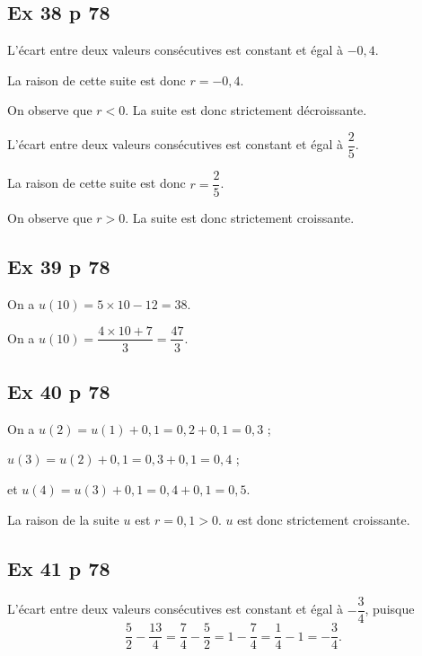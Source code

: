 \documentclass[12pt,a4paper]{book}
\begin{document}
\subsection*{Ex 38 p 78}


\begin{enumMet}
	\item L’écart entre deux valeurs consécutives est constant et égal à $-0,4$.
	
	La raison de cette suite est donc $r=-0,4$.
	
	On observe que $r<0$. La suite est donc strictement décroissante.
	\item L’écart entre deux valeurs consécutives est constant et égal à $\dfrac{2}{5}$.
	
	La raison de cette suite est donc $r=\dfrac{2}{5}$.
	
	On observe que $r>0$. La suite est donc strictement croissante.
\end{enumMet}

\subsection*{Ex 39 p 78}


\begin{enumMet}
	\item On a $u\left(10\right)=5 \times 10 -12=38$.
	\item On a $u\left(10\right)=\dfrac{4\times 10 +7}{3}=\dfrac{47}{3}$.
\end{enumMet}

\subsection*{Ex 40 p 78}

On a $u\left(2\right)=u\left(1\right)+0,1=0,2+0,1=0,3$ ;

$u\left(3\right)=u\left(2\right)+0,1=0,3+0,1=0,4$ ;

et $u\left(4\right)=u\left(3\right)+0,1=0,4+0,1=0,5$.



La raison de la suite $u$ est $r=0,1 >0$. $u$ est donc strictement croissante.

\subsection*{Ex 41 p 78}

L’écart entre deux valeurs consécutives est constant et égal à $-\dfrac{3}{4}$, puisque $$\dfrac{5}{2}-\dfrac{13}{4}=\dfrac{7}{4}-\dfrac{5}{2}=1-\dfrac{7}{4}=\dfrac{1}{4}-1=-\dfrac{3}{4}.$$
\end{document}
